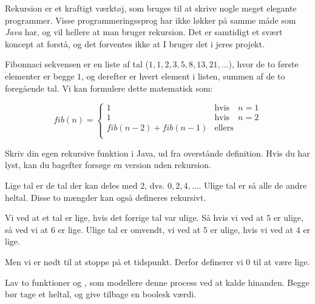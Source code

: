         Rekursion er et kraftigt værktøj, som bruges til at skrive
        nogle meget elegante programmer. Visse programmeringssprog har
        ikke løkker på samme måde som \emph{Java} har, og vil hellere
        at man bruger rekursion.  Det er samtidigt et svært koncept at
        forstå, og det forventes ikke at I bruger det i jeres projekt.

        \begin{exercise}
            Fibonnaci sekvensen er en liste af tal (\(1, 1, 2, 3, 5,
            8, 13, 21, \dots\)), hvor de to første elementer er
            begge \(1\), og derefter er hvert element i listen,
            summen af de to foregående tal. Vi kan formulere dette
            matematisk som:

            \begin{equation}
                fib(n) = \begin{cases}
                             1                   & \text{hvis} \quad n = 1 \\
                             1                   & \text{hvis} \quad n = 2 \\
                             fib(n-2)+fib(n-1)   & \text{ellers} \\
                      \end{cases}
            \end{equation}

            Skriv din egen rekursive  funktion i Java,
            ud fra overstånde definition. Hvis du har lyst, kan du
            bagefter forsøge en version uden rekursion.
        \end{exercise}

        \begin{exercise}
            Lige tal er de tal der kan deles med \(2\), dvs. \(0, 2, 4, \dots\).
            Ulige tal er så alle de andre heltal. Disse to mængder kan også defineres
            rekursivt.

            Vi ved at et tal er lige, hvis det forrige tal var ulige. Så hvis vi ved
            at \(5\) er ulige, så ved vi at \(6\) er lige. Ulige tal er omvendt, vi
            ved at \(5\) er ulige, hvis vi ved at \(4\) er lige.

            Men vi er nødt til at stoppe på et tidspunkt. Derfor definerer vi
            \(0\) til at være lige.

            Lav to funktioner  og , som modellere
            denne process ved at kalde hinanden. Begge bør tage et heltal, og give
            tilbage en boolesk værdi.


        \end{exercise}

